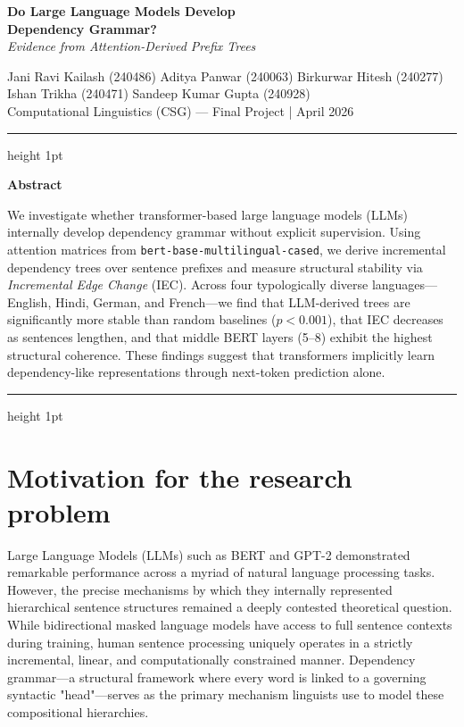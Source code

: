 \documentclass[11pt,a4paper]{article}
\begin{document}
\begin{center}
    \vspace*{0.2cm}
    \textcolor{CTtitle}{\Large\textbf{Do Large Language Models Develop\\ Dependency Grammar?}}\\
    \vspace{0.2cm}
    \textit{\large Evidence from Attention-Derived Prefix Trees}
\end{center}
\vspace{0.4cm}
\begin{center}
    Jani Ravi Kailash (240486) \quad Aditya Panwar (240063) \quad Birkurwar Hitesh (240277)\\[0.15cm]
    Ishan Trikha (240471) \quad Sandeep Kumar Gupta (240928)\\[0.25cm]
    \small Computational Linguistics (CSG) --- Final Project \quad | \quad April 2026
\end{center}
\vspace{0.3cm}
{\color{CTtitle}\hrule height 1pt}
\vspace{0.3cm}
\begin{center}
    \textcolor{CTtitle}{\textbf{Abstract}}
\end{center}
\vspace{-0.25cm}
{\color{CTtitle}
We investigate whether transformer-based large language models (LLMs) internally develop dependency grammar without explicit supervision. Using attention matrices from \texttt{bert-base-multilingual-cased}, we derive incremental dependency trees over sentence prefixes and measure structural stability via \textit{Incremental Edge Change} (IEC). Across four typologically diverse languages---English, Hindi, German, and French---we find that LLM-derived trees are significantly more stable than random baselines ($p < 0.001$), that IEC decreases as sentences lengthen, and that middle BERT layers (5--8) exhibit the highest structural coherence. These findings suggest that transformers implicitly learn dependency-like representations through next-token prediction alone.
}
\vspace{0.3cm}
{\color{CTtitle}\hrule height 1pt}
\vspace{0.5cm}

\section{Motivation for the research problem}

Large Language Models (LLMs) such as BERT and GPT-2 demonstrated remarkable performance across a myriad of natural language processing tasks. However, the precise mechanisms by which they internally represented hierarchical sentence structures remained a deeply contested theoretical question. While bidirectional masked language models have access to full sentence contexts during training, human sentence processing uniquely operates in a strictly incremental, linear, and computationally constrained manner. Dependency grammar---a structural framework where every word is linked to a governing syntactic "head"---serves as the primary mechanism linguists use to model these compositional hierarchies.
\end{document}
